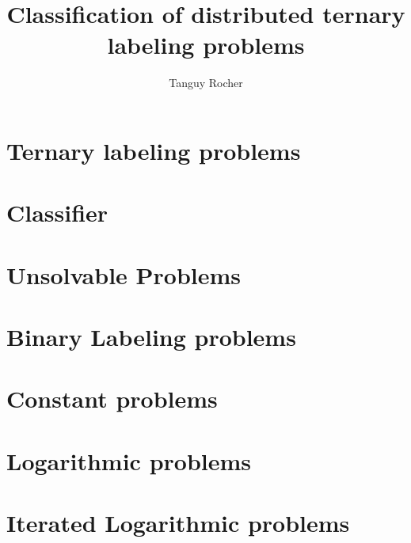 
\title{Classification of distributed ternary labeling problems}
\author{Tanguy Rocher}



\maketitle

\tableofcontents
\newpage
\chapter{Ternary labeling problems}


\newpage
\chapter{Classifier}


%
\newpage
\chapter{Unsolvable Problems}


\newpage
\chapter{Binary Labeling problems}


\newpage
\chapter{Constant problems}


\newpage
\chapter{Logarithmic problems}


\newpage
\chapter{Iterated Logarithmic problems}




